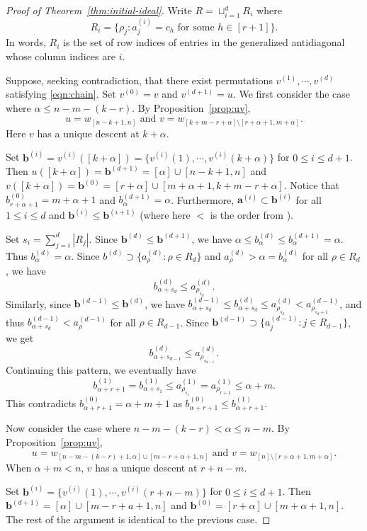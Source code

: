 \documentclass[12pt,reqno]{amsart}
\theoremstyle{definition}
\renewcommand{\aa}{\mathbf a}
\newcommand{\bb}{\mathbf b}
\begin{document}
{\begin{proof}[Proof of Theorem~\ref{thm:initial-ideal}]
Write $R = \sqcup_{i = 1}^d R_i$ where 
$$R_i = \{\rho_{j} : a_j^{(i)} = c_h \text{ for some } h\in [r+1]\}.$$
In words, $R_i$ is the set of row indices of entries in the generalized antidiagonal whose column indices are $i$.
    
    Suppose, seeking contradiction, that there exist permutations $v^{(1)},\cdots,v^{(d)}$ satisfying \eqref{eqn:chain}. Set $v^{(0)} = v$ and $v^{(d+1)} = u$. 
    We first consider the case where $\alpha \le n-m-(k-r)$. By Proposition~\ref{prop:uv}, 
    \[u=w_{[n-k+1,n]}\text{ and }v=w_{[k+m-r+\alpha]\setminus [r+\alpha+1,m+\alpha]}.\]
    Here $v$ has a unique descent at $k+\alpha$.
    
    Set $\bb^{(i)}=v^{(i)}([k+\alpha]) = \{v^{(i)}(1),\cdots, v^{(i)}(k+\alpha)\}$ for $0\le i\le d+1$. Then $u([k+\alpha]) = \bb^{(d+1)}=[\alpha]\cup[n-k+1,n]$ and $v([k+\alpha]) = \bb^{(0)}=[r+\alpha]\cup [m+\alpha+1,k+m-r+\alpha]$. Notice that $b^{(0)}_{r+\alpha+1}=m+\alpha+1$ and $b^{(d+1)}_\alpha=\alpha$. Furthermore, $\aa^{(i)}\subset \bb^{(i)} $ for all $1\le i\le d$ and $\bb^{(i)}\leq \bb^{(i+1)}$ (where here $<$ is the order from ).   

    Set $s_i = \sum_{j = i}^d |R_j|$. Since $\bb^{(d)}\leq \bb^{(d+1)}$, we have $\alpha\leq b^{(d)}_\alpha \leq b^{(d+1)}_\alpha = \alpha$. Thus $b^{(d)}_\alpha=\alpha$. Since $b^{(d)} \supset \{a^{(d)}_{\rho}:\rho\in R_d\}$ and $a^{(d)}_{\rho}> \alpha = b^{(d)}_\alpha$ for all $\rho\in R_d$, we have
    \[b^{(d)}_{\alpha+s_d} \leq a^{(d)}_{\rho_{s_d}}.\]
    Similarly, since $\bb^{(d-1)}\le \bb^{(d)}$, we have 
    $b^{(d-1)}_{\alpha+s_d}\le b^{(d)}_{\alpha+s_d}\le a^{(d)}_{\rho_{s_d}}<a_{\rho_{s_{d}+1}}^{(d-1)}$, and thus $b^{(d-1)}_{\alpha+s_d} < a^{(d-1)}_\rho$ for all $\rho\in R_{d-1}$.
    Since $\bb^{(d-1)}\supset \{a^{(d-1)}_{j}:j\in R_{d-1}\}$, we get
    \[b^{(d)}_{\alpha+s_{d-1}} \leq a^{(d)}_{\rho_{s_{d-1}}}.\]
    Continuing this pattern, we eventually have \[ b^{(1)}_{\alpha+r+1} = b^{(1)}_{\alpha+s_1} \leq a^{(1)}_{\rho_{s_1}} = a^{(1)}_{\rho_{r+1}} \leq \alpha+m.\] 
    This contradicts $b^{(0)}_{\alpha+r+1}=\alpha+m+1$ as $b^{(0)}_{\alpha+r+1} \leq b^{(1)}_{\alpha+r+1}$.
    

    Now consider the case where $n-m-(k-r)<\alpha\le n-m$. By Proposition~\ref{prop:uv}, $$u = w_{[n-m-(k-r)+1,\alpha]\cup[m-r+\alpha+1,n]}\text{ and }v = w_{[n]\setminus [r+\alpha+1,m+\alpha]}.$$ When $\alpha+m<n$, $v$ has a unique descent at $r+n-m$. 

    Set $\bb^{(i)}=\{v^{(i)}(1),\cdots, v^{(i)}(r+n-m)\}$ for $0\le i\le d+1$. Then $\bb^{(d+1)}=[\alpha]\cup[m-r+a+1,n]$ and $\bb^{(0)}=[r+\alpha]\cup[m+\alpha+1,n]$. The rest of the argument is identical to the previous case.


\end{proof}}
\end{document}
